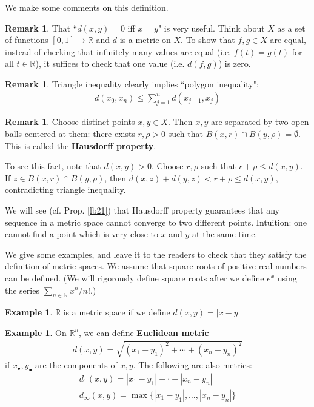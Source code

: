 \documentclass[12pt,b5paper,notitlepage]{article}
\theoremstyle{definition}
\newtheorem{eg}[df]{Example}
\newtheorem{rem}[df]{Remark}
\theoremstyle{plain}
\newcommand{\blt}{\bullet}
\newcommand{\Nbb}{\mathbb N}
\newcommand{\Rbb}{\mathbb R}
\numberwithin{equation}{section}
\begin{document}
We make some comments on this definition.


\begin{rem}
That ``$d(x,y)=0$ iff $x=y$" is very useful. Think about $X$ as a set of functions $[0,1]\rightarrow\Rbb$ and $d$ is a metric on $X$. To show that $f,g\in X$ are equal, instead of checking that infinitely many values are equal (i.e. $f(t)=g(t)$ for all $t\in\Rbb$), it suffices to check that one value (i.e. $d(f,g)$) is zero.
\end{rem}

\begin{rem}
Triangle inequality clearly implies ``polygon inequality":
\begin{align}
d(x_0,x_n)\leq\sum_{j=1}^n d(x_{j-1},x_j)
\end{align}
\end{rem}

\begin{rem}\label{lb20}
Choose distinct points $x,y\in X$. Then $x,y$ are separated by two open balls centered at them: there exists $r,\rho>0$ such that $B(x,r)\cap B(y,\rho)=\emptyset$. This is called the \textbf{Hausdorff property}. 

To see this fact, note that $d(x,y)>0$. Choose $r,\rho$ such that $r+\rho\leq d(x,y)$. If $z\in B(x,r)\cap B(y,\rho)$, then $d(x,z)+d(y,z)<r+\rho\leq d(x,y)$, contradicting triangle inequality.

We will see (cf. Prop. \ref{lb21}) that Hausdorff property guarantees that any sequence in a metric space cannot converge to two different points. Intuition: one cannot find a point which is very close to $x$ and $y$ at the same time.  \hfill\qedsymbol
\end{rem}



We give some examples, and leave it to the readers to check that they satisfy the definition of metric spaces. We assume that square roots of positive real numbers can be defined. (We will rigorously define square roots after we define $e^x$ using the series $\sum_{n\in\Nbb}x^n/n!$.)


\begin{eg}
$\Rbb$ is a metric space if we define $d(x,y)=|x-y|$
\end{eg}


\begin{eg}
On $\Rbb^n$, we can define \textbf{Euclidean metric} 
\begin{align*}
d(x,y)=\sqrt{(x_1-y_1)^2+\cdots+(x_n-y_n)^2}
\end{align*}
if $x_\blt,y_\blt$ are the components of $x,y$. The following are also metrics:
\begin{gather*}
d_1(x,y)=|x_1-y_1|+\cdot+|x_n-y_n|\\
d_\infty(x,y)=\max\{|x_1-y_1|,\dots,|x_n-y_n|\}
\end{gather*}
\end{eg}
\end{document}
